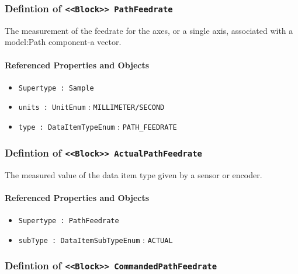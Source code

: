\subsubsection{Defintion of \texttt{<<Block>> PathFeedrate}}
  \label{type:PathFeedrate}

\FloatBarrier

The measurement of the feedrate for the axes, or a single axis, associated with a {model:Path} component-a vector.

\FloatBarrier
\paragraph{Referenced Properties and Objects}

\begin{itemize}
\item \texttt{Supertype : Sample}

\item \texttt{units : UnitEnum} : \texttt{MILLIMETER/SECOND}

\item \texttt{type : DataItemTypeEnum} : \texttt{PATH_FEEDRATE}

\end{itemize}
\FloatBarrier
\subsubsection{Defintion of \texttt{<<Block>> ActualPathFeedrate}}
  \label{type:ActualPathFeedrate}

\FloatBarrier

The measured value of the data item type given by a sensor or encoder.

\FloatBarrier
\paragraph{Referenced Properties and Objects}

\begin{itemize}
\item \texttt{Supertype : PathFeedrate}

\item \texttt{subType : DataItemSubTypeEnum} : \texttt{ACTUAL}

\end{itemize}
\FloatBarrier
\subsubsection{Defintion of \texttt{<<Block>> CommandedPathFeedrate}}
  \label{type:CommandedPathFeedrate}

